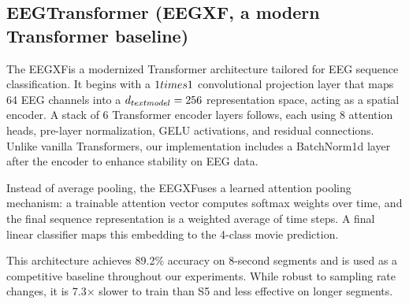 \documentclass{article}
\newcommand{\eegtrans}{EEGXF}
\begin{document}
\subsection{EEGTransformer (\eegtrans, a modern Transformer baseline)}
\label{sec:\eegtrans}
The \eegtrans is a modernized Transformer architecture tailored for EEG sequence classification. It begins with a $1\\times1$ convolutional projection layer that maps 64 EEG channels into a $d_{\\text{model}} = 256$ representation space, acting as a spatial encoder. A stack of 6 Transformer encoder layers follows, each using 8 attention heads, pre-layer normalization, GELU activations, and residual connections. Unlike vanilla Transformers, our implementation includes a BatchNorm1d layer after the encoder to enhance stability on EEG data.

Instead of average pooling, the \eegtrans uses a learned attention pooling mechanism: a trainable attention vector computes softmax weights over time, and the final sequence representation is a weighted average of time steps. A final linear classifier maps this embedding to the 4-class movie prediction.

This architecture achieves 89.2\% accuracy on 8-second segments and is used as a competitive baseline throughout our experiments. While robust to sampling rate changes, it is 7.3$\times$ slower to train than S5 and less effective on longer segments.
\end{document}
